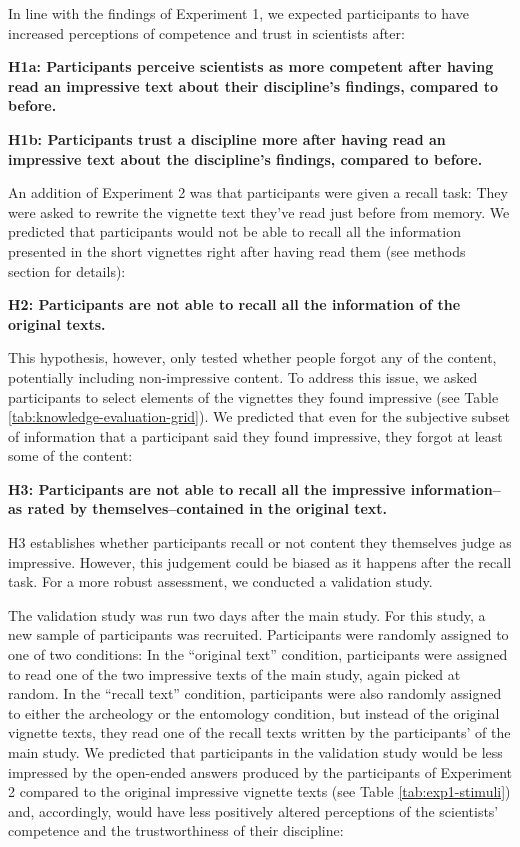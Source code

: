 \documentclass[
  doc,floatsintext]{apa6}
\begin{document}
In line with the findings of Experiment 1, we expected participants to have increased perceptions of competence and trust in scientists after:

\textbf{H1a: Participants perceive scientists as more competent after having read an impressive text about their discipline's findings, compared to before.}

\textbf{H1b: Participants trust a discipline more after having read an impressive text about the discipline's findings, compared to before.}

An addition of Experiment 2 was that participants were given a recall task: They were asked to rewrite the vignette text they've read just before from memory. We predicted that participants would not be able to recall all the information presented in the short vignettes right after having read them (see methods section for details):

\textbf{H2: Participants are not able to recall all the information of the original texts.}

This hypothesis, however, only tested whether people forgot any of the content, potentially including non-impressive content. To address this issue, we asked participants to select elements of the vignettes they found impressive (see Table \ref{tab:knowledge-evaluation-grid}). We predicted that even for the subjective subset of information that a participant said they found impressive, they forgot at least some of the content:

\textbf{H3: Participants are not able to recall all the impressive information--as rated by themselves--contained in the original text.}

H3 establishes whether participants recall or not content they themselves judge as impressive. However, this judgement could be biased as it happens after the recall task. For a more robust assessment, we conducted a validation study.

The validation study was run two days after the main study. For this study, a new sample of participants was recruited. Participants were randomly assigned to one of two conditions: In the ``original text'' condition, participants were assigned to read one of the two impressive texts of the main study, again picked at random. In the ``recall text'' condition, participants were also randomly assigned to either the archeology or the entomology condition, but instead of the original vignette texts, they read one of the recall texts written by the participants' of the main study. We predicted that participants in the validation study would be less impressed by the open-ended answers produced by the participants of Experiment 2 compared to the original impressive vignette texts (see Table \ref{tab:exp1-stimuli}) and, accordingly, would have less positively altered perceptions of the scientists' competence and the trustworthiness of their discipline:
\end{document}
